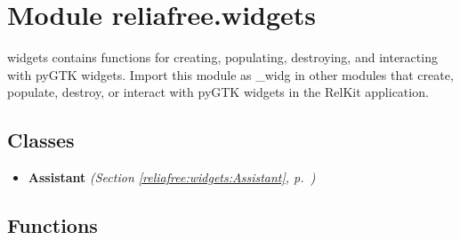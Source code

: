 %
%
%


\section{Module reliafree.widgets}

    \label{reliafree:widgets}
widgets contains functions for creating, populating, destroying, and 
interacting with pyGTK widgets.  Import this module as \_widg in other 
modules that create, populate, destroy, or interact with pyGTK widgets in 
the RelKit application.



\subsection{Classes}

\begin{itemize}  \setlength{\parskip}{0ex}
  \item \textbf{Assistant}
  \textit{(Section \ref{reliafree:widgets:Assistant}, p.~\pageref{reliafree:widgets:Assistant})}

\end{itemize}


  \subsection{Functions}

    \label{reliafree:widgets:make_button}

